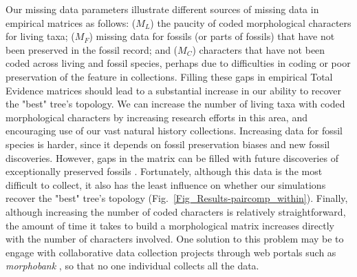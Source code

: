 \documentclass[12pt,letterpaper]{article}
\begin{document}
Our missing data parameters illustrate different sources of missing data in empirical matrices as follows: ($M_{L}$) the paucity of coded morphological characters for living taxa; ($M_{F}$) missing data for fossils (or parts of fossils) that have not been preserved in the fossil record; and ($M_{C}$) characters that have not been coded across living and fossil species, perhaps due to difficulties in coding or poor preservation of the feature in collections. Filling these gaps in empirical Total Evidence matrices should lead to a substantial increase in our ability to recover the "best" tree's topology. We can increase the number of living taxa with coded morphological characters by increasing research efforts in this area, and encouraging use of our vast natural history collections. Increasing data for fossil species is harder, since it depends on fossil preservation biases and new fossil discoveries. However, gaps in the matrix can be filled with future discoveries of exceptionally preserved fossils \citep[e.g.][]{nithe2013}. Fortunately, although this data is the most difficult to collect, it also has the least influence on whether our simulations recover the "best" tree's topology (Fig.~\ref{Fig_Results-paircomp_within}). Finally, although increasing the number of coded characters is relatively straightforward, the amount of time it takes to build a morphological matrix increases directly with the number of characters involved. One solution to this problem may be to engage with collaborative data collection projects through web portals such as \textit{morphobank} \citep{morphobank}, so that no one individual collects all the data.
\end{document}
